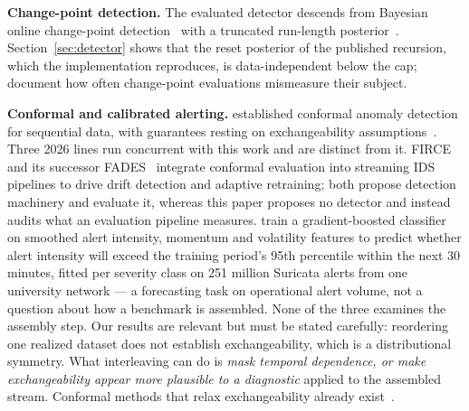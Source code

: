 \documentclass[manuscript,anonymous,review]{acmart}
\begin{document}
\textbf{Change-point detection.} The evaluated detector descends from Bayesian
online change-point detection~\citep{adams2007bocpd} with a truncated run-length
posterior~\citep{fearnhead2007online,knoblauch2018bocpd}.
Section~\ref{sec:detector} shows that the reset posterior of the published
recursion, which the implementation reproduces, is data-independent below the
cap; \citet{vandeburg2020evaluation} document how often change-point
evaluations mismeasure their subject.

\textbf{Conformal and calibrated alerting.} \citet{laxhammar2014conformal} established conformal anomaly detection
for sequential data, with guarantees resting on exchangeability
assumptions~\citep{vovk2005alrw}. Three 2026 lines run concurrent with this work
and are distinct from it. FIRCE~\citep{barrett2026firce} and its successor
FADES~\citep{barrett2026fades} integrate conformal evaluation into streaming IDS
pipelines to drive drift detection and adaptive retraining; both propose
detection machinery and evaluate it, whereas this paper proposes no detector and
instead audits what an evaluation pipeline measures. \citet{gurjar2026tailrisk} train a gradient-boosted classifier on smoothed
alert intensity, momentum and volatility features to predict whether alert
intensity will exceed the training period's 95th percentile within the next
30 minutes, fitted per severity class on 251 million Suricata alerts from one
university network --- a forecasting task on operational alert volume, not a
question about how a benchmark is assembled. None of the three examines the assembly step. Our
results are
relevant but must be stated carefully: reordering one realized dataset does not
establish exchangeability, which is a distributional symmetry. What
interleaving can do is \emph{mask temporal dependence, or make exchangeability
appear more plausible to a diagnostic} applied to the assembled stream.
Conformal methods that relax exchangeability already
exist~\citep{barber2023beyond}.
\end{document}
